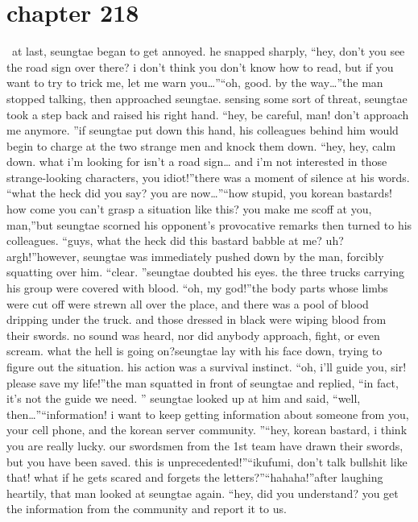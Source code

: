 \section{chapter 218}






 at last, seungtae began to get annoyed.
he snapped sharply, “hey, don’t you see the road sign over there? i don’t think you don’t know how to read, but if you want to try to trick me, let me warn you…”“oh, good.
 by the way…”the man stopped talking, then approached seungtae.
sensing some sort of threat, seungtae took a step back and raised his right hand.
“hey, be careful, man! don’t approach me anymore.
”if seungtae put down this hand, his colleagues behind him would begin to charge at the two strange men and knock them down.
“hey, hey, calm down.
 what i’m looking for isn’t a road sign… and i’m not interested in those strange-looking characters, you idiot!”there was a moment of silence at his words.
“what the heck did you say? you are now…”“how stupid, you korean bastards! how come you can’t grasp a situation like this? you make me scoff at you, man,”but seungtae scorned his opponent’s provocative remarks then turned to his colleagues.
“guys, what the heck did this bastard babble at me? uh? argh!”however, seungtae was immediately pushed down by the man, forcibly squatting over him.
“clear.
”seungtae doubted his eyes.
 the three trucks carrying his group were covered with blood.
“oh, my god!”the body parts whose limbs were cut off were strewn all over the place, and there was a pool of blood dripping under the truck.
 and those dressed in black were wiping blood from their swords.
no sound was heard, nor did anybody approach, fight, or even scream.
 what the hell is going on?seungtae lay with his face down, trying to figure out the situation.
 his action was a survival instinct.
“oh, i’ll guide you, sir! please save my life!”the man squatted in front of seungtae and replied, “in fact, it’s not the guide we need.
”
seungtae looked up at him and said, “well, then…”“information! i want to keep getting information about someone from you, your cell phone, and the korean server community.
”“hey, korean bastard, i think you are really lucky.
 our swordsmen from the 1st team have drawn their swords, but you have been saved.
 this is unprecedented!”“ikufumi, don’t talk bullshit like that! what if he gets scared and forgets the letters?”“hahaha!”after laughing heartily, that man looked at seungtae again.
“hey, did you understand? you get the information from the community and report it to us.
